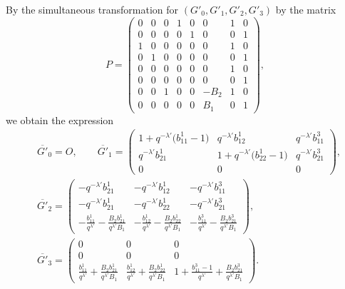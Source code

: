 \documentclass[pdftex]{sigma}
\numberwithin{equation}{section}
\theoremstyle{definition}
\begin{document}
By the simultaneous transformation for $(G'_0, G'_1,\allowbreak G'_2, G'_3)$ by the matrix
\begin{equation*}
P = \begin{pmatrix}
 0 & 0 & 0 & 1 & 0 & 0 & 1 & 0 \\
 0 & 0 & 0 & 0 & 1 & 0 & 0 & 1 \\
 1 & 0 & 0 & 0 & 0 & 0 & 1 & 0 \\
 0 & 1 & 0 & 0 & 0 & 0 & 0 & 1 \\
 0 & 0 & 0 & 0 & 0 & 0 & 1 & 0 \\
 0 & 0 & 0 & 0 & 0 & 0 & 0 & 1 \\
 0 & 0 & 1 & 0 & 0 & -B_2 & 1 & 0 \\
 0 & 0 & 0 & 0 & 0 & B_1 & 0 & 1
\end{pmatrix},
\end{equation*}
we obtain the expression
\begin{align*}
&\overline{G'}_0 = O , \qquad \overline{G'}_1
= \begin{pmatrix}
 1 + q^{-\lambda'}\bigl(b^1_{11}-1\bigr) & q^{-\lambda'}b^1_{12} & q^{-\lambda'}b^3_{11} \\
 q^{-\lambda'}b^1_{21} & 1 + q^{-\lambda'}\bigl(b^1_{22}-1\bigr) & q^{-\lambda'}b^3_{21} \\
 0 & 0 & 0
 \end{pmatrix}, \\
&\overline{G'}_2
= \begin{pmatrix}
 -q^{-\lambda'}b^1_{21} & -q^{-\lambda'}b^1_{12} & -q^{-\lambda'}b^3_{11} \\
 -q^{-\lambda'}b^1_{21} & -q^{-\lambda'}b^1_{22} & -q^{-\lambda'}b^3_{21} \\
 -\displaystyle \frac{b^1_{11}}{q^{\lambda'}}-\frac{B_2 b^1_{21}}{q^{\lambda'}B_1}
 & -\displaystyle \frac{b^1_{12}}{q^{\lambda'}} -\frac{B_2 b^1_{22}}{q^{\lambda'}B_1}
 & -\displaystyle \frac{b^3_{11}}{q^{\lambda'}}-\frac{B_2 b^3_{21}}{q^{\lambda'}B_1}
 \end{pmatrix}, \\
&\overline{G'}_3
= \begin{pmatrix}
 0 & 0 & 0 \\
 0 & 0 & 0 \\
 \displaystyle \frac{b^1_{11}}{q^{\lambda'}}+\frac{B_2 b^1_{21}}{q^{\lambda'}B_1}
 & \displaystyle \frac{b^1_{12}}{q^{\lambda'}}+\frac{B_2 b^1_{22}}{q^{\lambda'}B_1}
 & 1+\displaystyle \frac{b^3_{11}-1}{q^{\lambda'}}+\frac{B_2 b^3_{21}}{q^{\lambda'}B_1}
 \end{pmatrix}.
\end{align*}
\end{document}
